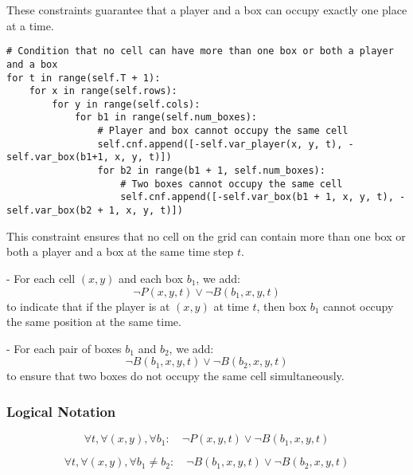 \documentclass[12pt,a4paper]{article}
\begin{document}
These constraints guarantee that a player and a box can occupy exactly one place at a time.



\begin{lstlisting}
# Condition that no cell can have more than one box or both a player and a box
for t in range(self.T + 1):
    for x in range(self.rows):
        for y in range(self.cols):
            for b1 in range(self.num_boxes):
                # Player and box cannot occupy the same cell
                self.cnf.append([-self.var_player(x, y, t), -self.var_box(b1+1, x, y, t)])
                for b2 in range(b1 + 1, self.num_boxes):
                    # Two boxes cannot occupy the same cell
                    self.cnf.append([-self.var_box(b1 + 1, x, y, t), -self.var_box(b2 + 1, x, y, t)])
\end{lstlisting}

This constraint ensures that no cell on the grid can contain more than one box or both a player and a box at the same time step \(t\).  

- For each cell \((x,y)\) and each box \(b_1\), we add:
\[
\neg P(x,y,t) \lor \neg B(b_1, x, y, t)
\]
to indicate that if the player is at \((x,y)\) at time \(t\), then box \(b_1\) cannot occupy the same position at the same time.  

- For each pair of boxes \(b_1\) and \(b_2\), we add:
\[
\neg B(b_1, x, y, t) \lor \neg B(b_2, x, y, t)
\]
to ensure that two boxes do not occupy the same cell simultaneously.

\subsubsection*{Logical Notation}

\[
\forall t, \forall (x,y), \forall b_1: \quad \neg P(x,y,t) \lor \neg B(b_1,x,y,t)
\]

\[
\forall t, \forall (x,y), \forall b_1 \neq b_2: \quad \neg B(b_1,x,y,t) \lor \neg B(b_2,x,y,t)
\]

\newpage
\end{document}

